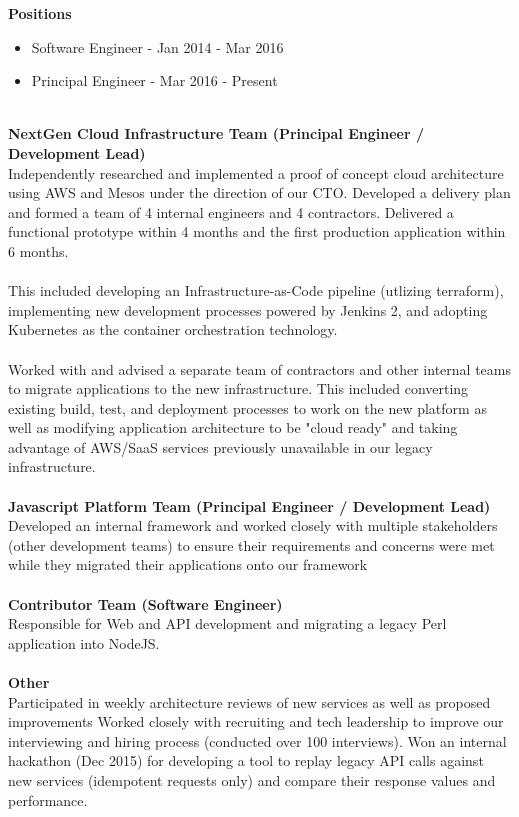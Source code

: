 \documentclass[11pt,letterpaper,sans]{moderncv}
\begin{document}
{
\textbf{Positions}
\begin{itemize}
  \item Software Engineer - Jan 2014 - Mar 2016
  \item Principal Engineer - Mar 2016 - Present
\end{itemize}
~\\
\textbf{NextGen Cloud Infrastructure Team (Principal Engineer / Development Lead)} \\
Independently researched and implemented a proof of concept cloud architecture using AWS and Mesos under the direction of our CTO.
Developed a delivery plan and formed a team of 4 internal engineers and 4 contractors.
Delivered a functional prototype within 4 months and the first production application within 6 months.
\\
\\
This included developing an Infrastructure-as-Code pipeline (utlizing terraform),
implementing new development processes powered by Jenkins 2,
and adopting Kubernetes as the container orchestration technology.
\\
\\
Worked with and advised a separate team of contractors and other internal teams to migrate applications to the new infrastructure.
This included converting existing build, test, and deployment processes to work on the new platform as well as modifying application architecture to be "cloud ready" and taking advantage of AWS/SaaS services previously unavailable in our legacy infrastructure.
\\
\\
\textbf{Javascript Platform Team (Principal Engineer / Development Lead)} \\
Developed an internal framework and worked closely with multiple stakeholders (other development teams) to ensure their requirements and concerns were met while they migrated their applications onto our framework
\\
\\
\textbf{Contributor Team (Software Engineer)} \\
Responsible for Web and API development and migrating a legacy Perl application into NodeJS.
\\
\\
\textbf{Other} \\
Participated in weekly architecture reviews of new services as well as proposed improvements
Worked closely with recruiting and tech leadership to improve our interviewing and hiring process (conducted over 100 interviews).
Won an internal hackathon (Dec 2015) for developing a tool to replay legacy API calls against new services (idempotent requests only) and compare their response values and performance.
\\
}
\end{document}
